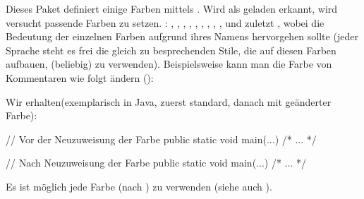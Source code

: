 \documentclass{sopra-base}
\begin{document}
    Dieses Paket definiert einige Farben mittels . Wird  als geladen erkannt, wird versucht passende Farben zu setzen. : , , , , , , , , ,  und zuletzt , wobei die Bedeutung der einzelnen Farben aufgrund ihres Namens hervorgehen sollte (jeder Sprache steht es frei die gleich zu besprechenden Stile, die
    auf diesen Farben aufbauen, (beliebig) zu verwenden). Beispielsweise kann man die Farbe
    von Kommentaren wie folgt ändern ():
\begin{plainlatex}[morekeywords={[2]{\\lstcolorlet}}]
\end{plainlatex}
    Wir erhalten(exemplarisch in Java, zuerst standard, danach mit geänderter Farbe):
    \begingroup
\begin{java}
// Vor der Neuzuweisung der Farbe
public static void main(...){ /* ... */ }
\end{java}
\begin{java}
// Nach Neuzuweisung der Farbe
public static void main(...){ /* ... */ }
    \end{java}
    \endgroup
 Es ist möglich jede Farbe (nach ) zu verwenden (siehe auch ).
\end{document}
